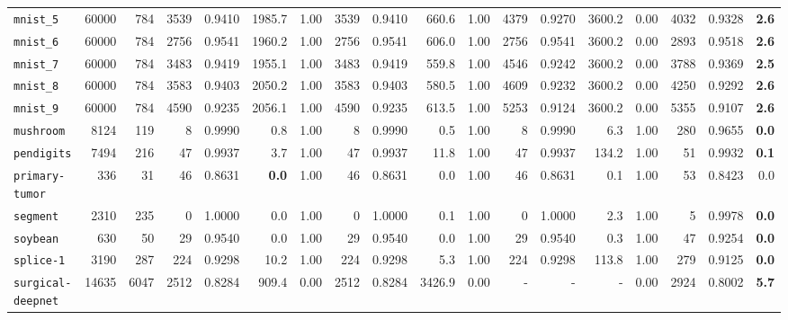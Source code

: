 \begin{tabular}{lccrrrrrrrrrrrrrrr}
\texttt{mnist\_5} & \multicolumn{1}{r}{60000} & \multicolumn{1}{r}{784}  & 3539 & 0.9410 & 1985.7 & 1.00 & 3539 & 0.9410 & 660.6 & 1.00 & 4379 & 0.9270 & 3600.2 & 0.00 & 4032 & 0.9328 & \textbf{2.6}\\
\texttt{mnist\_6} & \multicolumn{1}{r}{60000} & \multicolumn{1}{r}{784}  & 2756 & 0.9541 & 1960.2 & 1.00 & 2756 & 0.9541 & 606.0 & 1.00 & 2756 & 0.9541 & 3600.2 & 0.00 & 2893 & 0.9518 & \textbf{2.6}\\
\texttt{mnist\_7} & \multicolumn{1}{r}{60000} & \multicolumn{1}{r}{784}  & 3483 & 0.9419 & 1955.1 & 1.00 & 3483 & 0.9419 & 559.8 & 1.00 & 4546 & 0.9242 & 3600.2 & 0.00 & 3788 & 0.9369 & \textbf{2.5}\\
\texttt{mnist\_8} & \multicolumn{1}{r}{60000} & \multicolumn{1}{r}{784}  & 3583 & 0.9403 & 2050.2 & 1.00 & 3583 & 0.9403 & 580.5 & 1.00 & 4609 & 0.9232 & 3600.2 & 0.00 & 4250 & 0.9292 & \textbf{2.6}\\
\texttt{mnist\_9} & \multicolumn{1}{r}{60000} & \multicolumn{1}{r}{784}  & 4590 & 0.9235 & 2056.1 & 1.00 & 4590 & 0.9235 & 613.5 & 1.00 & 5253 & 0.9124 & 3600.2 & 0.00 & 5355 & 0.9107 & \textbf{2.6}\\
\texttt{mushroom} & \multicolumn{1}{r}{8124} & \multicolumn{1}{r}{119}  & 8 & 0.9990 & 0.8 & 1.00 & 8 & 0.9990 & 0.5 & 1.00 & 8 & 0.9990 & 6.3 & 1.00 & 280 & 0.9655 & \textbf{0.0}\\
\texttt{pendigits} & \multicolumn{1}{r}{7494} & \multicolumn{1}{r}{216}  & 47 & 0.9937 & 3.7 & 1.00 & 47 & 0.9937 & 11.8 & 1.00 & 47 & 0.9937 & 134.2 & 1.00 & 51 & 0.9932 & \textbf{0.1}\\
\texttt{primary-tumor} & \multicolumn{1}{r}{336} & \multicolumn{1}{r}{31}  & 46 & 0.8631 & \textbf{0.0} & 1.00 & 46 & 0.8631 & 0.0 & 1.00 & 46 & 0.8631 & 0.1 & 1.00 & 53 & 0.8423 & 0.0\\
\texttt{segment} & \multicolumn{1}{r}{2310} & \multicolumn{1}{r}{235}  & 0 & 1.0000 & 0.0 & 1.00 & 0 & 1.0000 & 0.1 & 1.00 & 0 & 1.0000 & 2.3 & 1.00 & 5 & 0.9978 & \textbf{0.0}\\
\texttt{soybean} & \multicolumn{1}{r}{630} & \multicolumn{1}{r}{50}  & 29 & 0.9540 & 0.0 & 1.00 & 29 & 0.9540 & 0.0 & 1.00 & 29 & 0.9540 & 0.3 & 1.00 & 47 & 0.9254 & \textbf{0.0}\\
\texttt{splice-1} & \multicolumn{1}{r}{3190} & \multicolumn{1}{r}{287}  & 224 & 0.9298 & 10.2 & 1.00 & 224 & 0.9298 & 5.3 & 1.00 & 224 & 0.9298 & 113.8 & 1.00 & 279 & 0.9125 & \textbf{0.0}\\
\texttt{surgical-deepnet} & \multicolumn{1}{r}{14635} & \multicolumn{1}{r}{6047}  & 2512 & 0.8284 & 909.4 & 0.00 & 2512 & 0.8284 & 3426.9 & 0.00 & - & - & - & 0.00 & 2924 & 0.8002 & \textbf{5.7}\\

\end{tabular}
